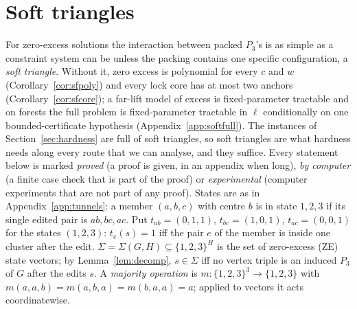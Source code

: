 \section{Soft triangles}\label{sec:soft}
For zero-excess solutions the interaction between packed $P_3$'s is as simple as a constraint system can be unless the packing contains one specific configuration, a \emph{soft triangle}. Without it, zero excess is polynomial for every $c$ and $w$ (Corollary~\ref{cor:sfpoly}) and every lock core has at most two anchors (Corollary~\ref{cor:sfcore}); a far-lift model of excess is fixed-parameter tractable and on forests the full problem is fixed-parameter tractable in $\ell$ conditionally on one bounded-certificate hypothesis (Appendix~\ref{app:softfull}). The instances of Section~\ref{sec:hardness} are full of soft triangles, so soft triangles are what hardness needs along every route that we can analyse, and they suffice. Every statement below is marked \emph{proved} (a proof is given, in an appendix when long), \emph{by computer} (a finite case check that is part of the proof) or \emph{experimental} (computer experiments that are not part of any proof).
 States are as in Appendix~\ref{app:tunnels}: a member $(a,b,c)$ with centre $b$ is in state $1,2,3$ if its single edited pair is $ab,bc,ac$. Put $t_{ab}=(0,1,1)$, $t_{bc}=(1,0,1)$, $t_{ac}=(0,0,1)$ for the states $(1,2,3)$: $t_e(s)=1$ iff the pair $e$ of the member is inside one cluster after the edit. $\Sigma=\Sigma(G,H)\subseteq\{1,2,3\}^H$ is the set of zero-excess (ZE) state vectors; by Lemma~\ref{lem:decomp}, $s\in\Sigma$ iff no vertex triple is an induced $P_3$ of $G$ after the edits $s$. A \emph{majority operation} is $m:\{1,2,3\}^3\to\{1,2,3\}$ with $m(a,a,b)=m(a,b,a)=m(b,a,a)=a$; applied to vectors it acts coordinatewise.

